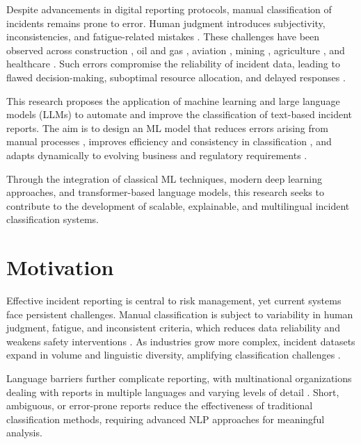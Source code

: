 \documentclass[11pt, titlepage, bibliography=totoc]{scrreprt}
\begin{document}
Despite advancements in digital reporting protocols, manual classification of incidents remains prone to error. Human judgment introduces subjectivity, inconsistencies, and fatigue-related mistakes \cite{4_Kurian}. These challenges have been observed across construction \cite{Zhong2020}, oil and gas \cite{Sattari2021OilGas}, aviation \cite{Madeira2021}, mining \cite{8_Ganguli}, agriculture \cite{9_Kakhki}, and healthcare \cite{10_Mathew}. Such errors compromise the reliability of incident data, leading to flawed decision-making, suboptimal resource allocation, and delayed responses \cite{11_Mustapha}.

This research proposes the application of machine learning and large language models (LLMs) to automate and improve the classification of text-based incident reports. The aim is to design an ML model that reduces errors arising from manual processes \cite{12_Silva}, improves efficiency and consistency in classification \cite{13_Bugalia}, and adapts dynamically to evolving business and regulatory requirements \cite{14_Chen}.

Through the integration of classical ML techniques, modern deep learning approaches, and transformer-based language models, this research seeks to contribute to the development of scalable, explainable, and multilingual incident classification systems.

\newpage

\section{Motivation}

Effective incident reporting is central to risk management, yet current systems face persistent challenges. Manual classification is subject to variability in human judgment, fatigue, and inconsistent criteria, which reduces data reliability and weakens safety interventions \cite{Sattari2021OilGas}. As industries grow more complex, incident datasets expand in volume and linguistic diversity, amplifying classification challenges \cite{13_Bugalia}.

Language barriers further complicate reporting, with multinational organizations dealing with reports in multiple languages and varying levels of detail \cite{macleod2024loss}. Short, ambiguous, or error-prone reports reduce the effectiveness of traditional classification methods, requiring advanced NLP approaches for meaningful analysis.
\end{document}
